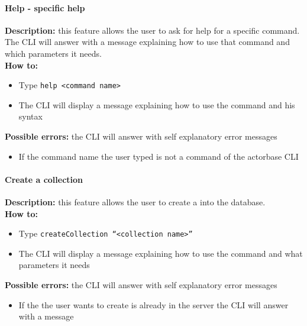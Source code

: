 \documentclass{scalatekids-article}
\begin{document}


\paragraph{Help - specific help}
\label{sec:specifichelp}
\textbf{Description:} this feature allows the user to ask for help for
a specific command.\\
The CLI will answer with a message explaining how to use that command and
which parameters it needs.\\
\textbf{How to:}
\begin{itemize}
\item Type \texttt{help <command name>}
\item The CLI will display a message explaining how to use the command and his syntax
\end{itemize}
\textbf{Possible errors:} the CLI will answer with self explanatory error messages
\begin{itemize}
\item If the command name the user typed is not a command of the actorbase CLI
\end{itemize}

\paragraph{Create a collection}
\label{sec:createcollection}
\textbf{Description:} this feature allows the user to create a
 into the database.\\
\textbf{How to:}
\begin{itemize}
\item Type \texttt{createCollection ``<collection name>''}
\item The CLI will display a message explaining how to use the command and what parameters it needs
\end{itemize}
\textbf{Possible errors:} the CLI will answer with self explanatory error messages
\begin{itemize}
\item If the  the user wants to create is already in the server the CLI will answer with a message
\end{itemize}
\end{document}
